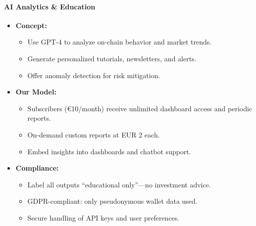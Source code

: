 \documentclass[13pt]{extarticle}
\begin{document}
\paragraph{AI Analytics \& Education}
\begin{itemize}[left=1em]
  \item \textbf{Concept:}
    \begin{itemize}[left=1.2em]
      \item Use GPT-4 to analyze on-chain behavior and market trends.
      \item Generate personalized tutorials, newsletters, and alerts.
      \item Offer anomaly detection for risk mitigation.
    \end{itemize}
  \item \textbf{Our Model:}
    \begin{itemize}[left=1.2em]
      \item Subscribers (€10/month) receive unlimited dashboard access and periodic reports.
      \item On-demand custom reports at EUR 2 each.
      \item Embed insights into dashboards and chatbot support.
    \end{itemize}
  \item \textbf{Compliance:}
    \begin{itemize}[left=1.2em]
      \item Label all outputs “educational only”—no investment advice.
      \item GDPR-compliant: only pseudonymous wallet data used.
      \item Secure handling of API keys and user preferences.
    \end{itemize}
\end{itemize}
\end{document}
